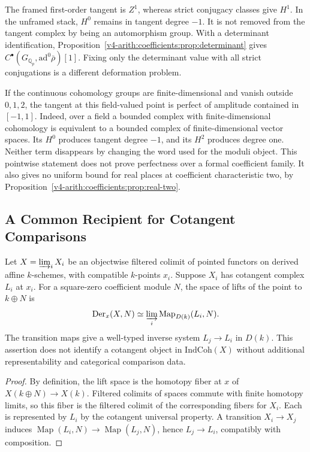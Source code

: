 The framed first-order tangent is \(Z^1\), whereas strict conjugacy
classes give \(H^1\). In the unframed stack, \(H^0\) remains in
tangent degree \(-1\). It is not removed from the tangent complex
by being an automorphism group. With a determinant identification,
Proposition~\ref{v4-arith:coefficients:prop:determinant} gives
\(C^\bullet(G_{\mathbb Q_p},\mathrm{ad}^0\bar\rho)[1]\).
Fixing only the determinant value with all strict conjugations is a
different deformation problem.

\begin{remark}
\label{v4-arith:bzn-sub:rem:perfect-tor}
If the continuous cohomology groups are finite-dimensional and vanish
outside \(0,1,2\), the tangent at this field-valued point is perfect
of amplitude contained in \([-1,1]\). Indeed, over a field a bounded
complex with finite-dimensional cohomology is equivalent to a bounded
complex of finite-dimensional vector spaces. Its \(H^0\) produces
tangent degree \(-1\), and its \(H^2\) produces degree one.
Neither term disappears by changing the word used for the moduli
object. This pointwise statement does not prove perfectness over a
formal coefficient family. It also gives no uniform bound for real
places at coefficient characteristic two, by
Proposition~\ref{v4-arith:coefficients:prop:real-two}.
\end{remark}

\subsection{A Common Recipient for Cotangent Comparisons}

\begin{proposition}
\label{v4-arith:bzn-sub:prop:cotangent-ind-level}
Let \(X=\varinjlim_iX_i\) be an objectwise filtered colimit of
pointed functors on derived affine \(k\)-schemes, with compatible
\(k\)-points \(x_i\). Suppose \(X_i\) has cotangent complex
\(L_i\) at \(x_i\). For a square-zero coefficient module \(N\),
the space of lifts of the point to \(k\oplus N\) is
\[
 \operatorname{Der}_x(X,N)
 \simeq\varinjlim_i\operatorname{Map}_{D(k)}(L_i,N).
\]
The transition maps give a well-typed inverse system
\(L_j\to L_i\) in \(D(k)\). This assertion does not identify a
cotangent object in \(\mathrm{IndCoh}(X)\) without additional
representability and categorical comparison data.
\end{proposition}
\begin{proof}
By definition, the lift space is the homotopy fiber at \(x\) of
\(X(k\oplus N)\to X(k)\). Filtered colimits of spaces commute
with finite homotopy limits, so this fiber is the filtered colimit
of the corresponding fibers for \(X_i\). Each is represented by
\(L_i\) by the cotangent universal property. A transition
\(X_i\to X_j\) induces
\(\operatorname{Map}(L_i,N)\to\operatorname{Map}(L_j,N)\), hence
\(L_j\to L_i\), compatibly with composition.
\end{proof}


